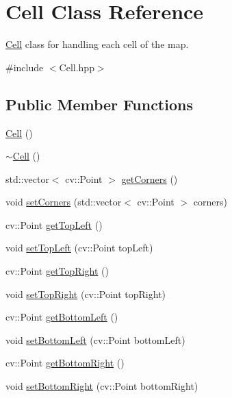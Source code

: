 \hypertarget{class_cell}{}\section{Cell Class Reference}
\label{class_cell}


\mbox{\hyperlink{class_cell}{Cell}} class for handling each cell of the map.  




{\ttfamily \#include $<$Cell.\+hpp$>$}

\subsection*{Public Member Functions}
\begin{DoxyCompactItemize}
\item 
\mbox{\hyperlink{class_cell_a394510643e8664cf12b5efaf5cb99f71}{Cell}} ()
\item 
\mbox{\hyperlink{class_cell_a9fa559f7a28e2b4336c6879ca09304d8}{$\sim$\+Cell}} ()
\item 
std\+::vector$<$ cv\+::\+Point $>$ \mbox{\hyperlink{class_cell_a03becce6b307d86848e9563eb08ac2b3}{get\+Corners}} ()
\item 
void \mbox{\hyperlink{class_cell_a6d1ad0f2766cdd641ba0e65f8b3c9555}{set\+Corners}} (std\+::vector$<$ cv\+::\+Point $>$ corners)
\item 
cv\+::\+Point \mbox{\hyperlink{class_cell_ac6e9338748b2098e034641c88a977b23}{get\+Top\+Left}} ()
\item 
void \mbox{\hyperlink{class_cell_a9e2d13652a170ef25265a41dfe39e93f}{set\+Top\+Left}} (cv\+::\+Point top\+Left)
\item 
cv\+::\+Point \mbox{\hyperlink{class_cell_a4b08bffc22a4393fd86c9608d9723d7c}{get\+Top\+Right}} ()
\item 
void \mbox{\hyperlink{class_cell_a245afe36e263e2fbf66880e4ea628f40}{set\+Top\+Right}} (cv\+::\+Point top\+Right)
\item 
cv\+::\+Point \mbox{\hyperlink{class_cell_a1946142c5e112176e1cd20cc6d07f831}{get\+Bottom\+Left}} ()
\item 
void \mbox{\hyperlink{class_cell_a86387a50a4c3f641eede253ce6cfcddb}{set\+Bottom\+Left}} (cv\+::\+Point bottom\+Left)
\item 
cv\+::\+Point \mbox{\hyperlink{class_cell_afa1704102095fd55ac036f7d290eed05}{get\+Bottom\+Right}} ()
\item 
void \mbox{\hyperlink{class_cell_ae68ff90cfde34cec208e8e74ce3f2745}{set\+Bottom\+Right}} (cv\+::\+Point bottom\+Right)

\end{DoxyCompactItemize}
